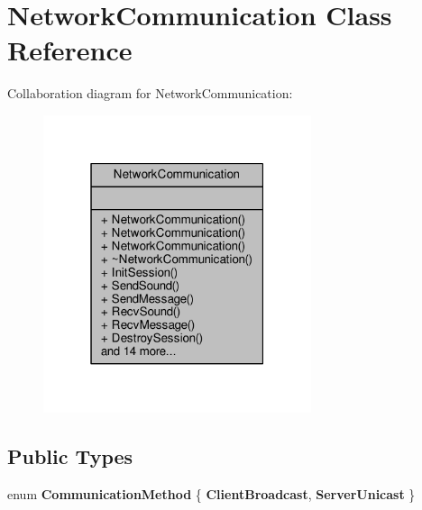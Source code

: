 \hypertarget{classNetworkCommunication}{}\section{Network\+Communication Class Reference}
\label{classNetworkCommunication}


Collaboration diagram for Network\+Communication\+:
\nopagebreak
\begin{figure}[H]
\begin{center}
\leavevmode
\includegraphics[width=223pt]{d1/d5b/classNetworkCommunication__coll__graph}
\end{center}
\end{figure}
\subsection*{Public Types}
\begin{DoxyCompactItemize}
\item 
enum {\bfseries Communication\+Method} \{ {\bfseries Client\+Broadcast}, 
{\bfseries Server\+Unicast}
 \}\hypertarget{classNetworkCommunication_a67b9391a72b5ce271cd14fb36b03930c}{}\label{classNetworkCommunication_a67b9391a72b5ce271cd14fb36b03930c}

\end{DoxyCompactItemize}
